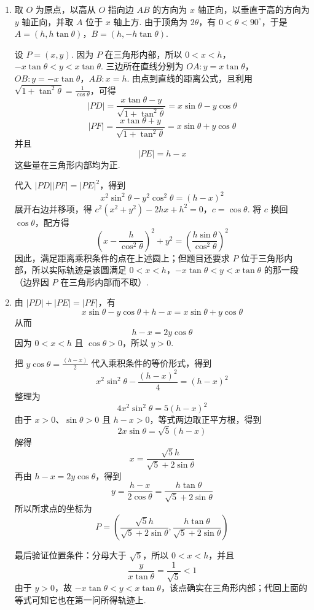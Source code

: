 \documentclass[UTF8,a4paper,oneside,11pt]{ctexbook}
\begin{document}
\begin{solution}
\begin{enumerate}
\item 取 \(O\) 为原点，以高从 \(O\) 指向边 \(AB\) 的方向为 \(x\) 轴正向，以垂直于高的方向为 \(y\) 轴正向，并取 \(A\) 位于 \(x\) 轴上方. 由于顶角为 \(2\theta\)，有 \(0<\theta<90^{\circ}\)，于是
\(A=(h,h\tan\theta)\)，\(B=(h,-h\tan\theta)\).

设 \(P=(x,y)\). 因为 \(P\) 在三角形内部，所以
\(0<x<h\)，\(-x\tan\theta<y<x\tan\theta\).
三边所在直线分别为
\(OA: y=x\tan\theta\)，\(OB: y=-x\tan\theta\)，\(AB: x=h\).
由点到直线的距离公式，且利用 \(\sqrt{1+\tan^2\theta}=\frac{1}{\cos\theta}\)，可得
\[
\lvert PD\rvert
=\frac{x\tan\theta-y}{\sqrt{1+\tan^2\theta}}
=x\sin\theta-y\cos\theta
\]
\[
\lvert PF\rvert
=\frac{x\tan\theta+y}{\sqrt{1+\tan^2\theta}}
=x\sin\theta+y\cos\theta
\]
并且
\[
\lvert PE\rvert=h-x
\]
这些量在三角形内部均为正.

代入 \(\lvert PD\rvert\lvert PF\rvert=\lvert PE\rvert^2\)，得到
\[
x^2\sin^2\theta-y^2\cos^2\theta=(h-x)^2
\]
展开右边并移项，得
\(c^2\left(x^2+y^2\right)-2hx+h^2=0\)，\(c=\cos\theta\).
将 \(c\) 换回 \(\cos\theta\)，配方得
\[
\left(x-\frac{h}{\cos^2\theta}\right)^2+y^2
=\left(\frac{h\sin\theta}{\cos^2\theta}\right)^2
\]
因此，满足距离乘积条件的点在上述圆上；但题目还要求 \(P\) 位于三角形内部，所以实际轨迹是该圆满足
\(0<x<h\)，\(-x\tan\theta<y<x\tan\theta\)
的那一段（边界因 \(P\) 在三角形内部而不取）.

\item 由 \(\lvert PD\rvert+\lvert PE\rvert=\lvert PF\rvert\)，有
\[
x\sin\theta-y\cos\theta+h-x=x\sin\theta+y\cos\theta
\]
从而
\[
h-x=2y\cos\theta
\]
因为 \(0<x<h\) 且 \(\cos\theta>0\)，所以 \(y>0\).

把 \(y\cos\theta=\frac{(h-x)}{2}\) 代入乘积条件的等价形式，得到
\[
x^2\sin^2\theta-\frac{(h-x)^2}{4}=(h-x)^2
\]
整理为
\[
4x^2\sin^2\theta=5(h-x)^2
\]
由于 \(x>0\)、\(\sin\theta>0\) 且 \(h-x>0\)，等式两边取正平方根，得到
\[
2x\sin\theta=\sqrt{5}\left(h-x\right)
\]
解得
\[
x=\frac{\sqrt{5}h}{\sqrt{5}+2\sin\theta}
\]
再由 \(h-x=2y\cos\theta\)，得到
\[
y=\frac{h-x}{2\cos\theta}=\frac{h\tan\theta}{\sqrt{5}+2\sin\theta}
\]
所以所求点的坐标为
\[
P=\left(\frac{\sqrt{5}h}{\sqrt{5}+2\sin\theta},
\frac{h\tan\theta}{\sqrt{5}+2\sin\theta}\right)
\]

最后验证位置条件：分母大于 \(\sqrt5\)，所以 \(0<x<h\)，并且
\[
\frac{y}{x\tan\theta}=\frac{1}{\sqrt5}<1
\]
由于 \(y>0\)，故 \(-x\tan\theta<y<x\tan\theta\)，该点确实在三角形内部；代回上面的等式可知它也在第一问所得轨迹上.
\end{enumerate}
\end{solution}

\end{document}

